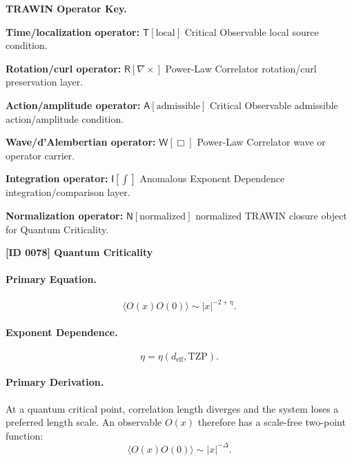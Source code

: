 \par\vspace{0.45\baselineskip}
\noindent\begin{minipage}[t]{\linewidth}
\begingroup
\small
\raggedright
\textbf{TRAWIN Operator Key.}\par
\noindent\textbf{Time/localization operator:} $\mathsf{T}\!\left[\mathrm{local}\right]$ Critical Observable local source condition.\par
\noindent\textbf{Rotation/curl operator:} $\mathsf{R}\!\left[\nabla\times\right]$ Power-Law Correlator rotation/curl preservation layer.\par
\noindent\textbf{Action/amplitude operator:} $\mathsf{A}\!\left[\mathrm{admissible}\right]$ Critical Observable admissible action/amplitude condition.\par
\noindent\textbf{Wave/d'Alembertian operator:} $\mathsf{W}\!\left[\Box\right]$ Power-Law Correlator wave or operator carrier.\par
\noindent\textbf{Integration operator:} $\mathsf{I}\!\left[\int\right]$ Anomalous Exponent Dependence integration/comparison layer.\par
\noindent\textbf{Normalization operator:} $\mathsf{N}\!\left[\mathrm{normalized}\right]$ normalized TRAWIN closure object for Quantum Criticality.\par
\endgroup
\end{minipage}

\clearpage
\noindent\textbf{[ID 0078] Quantum Criticality}\par
\vspace{0.35em}
\paragraph{Primary Equation.}
\begin{equation}
\langle O(x)O(0)\rangle
\sim
|x|^{-2+\eta}.
\end{equation}

\paragraph{Exponent Dependence.}
\begin{equation}
\eta=\eta(d_{\mathrm{eff}},\mathrm{TZP}).
\end{equation}

\paragraph{Primary Derivation.}
At a quantum critical point, correlation length diverges and the system loses a preferred length scale.  
An observable $O(x)$ therefore has a scale-free two-point function:
\begin{equation}
\langle O(x)O(0)\rangle
\sim
|x|^{-\Delta}.
\end{equation}

